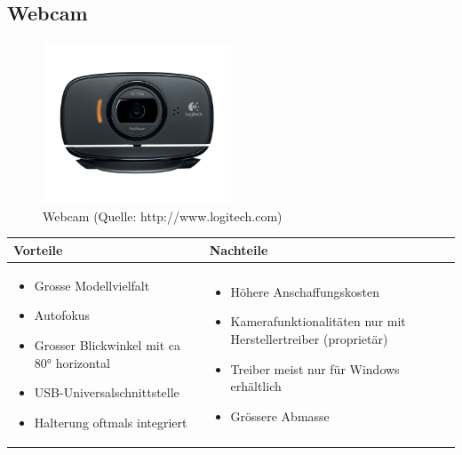 \pagebreak

\subsection{Webcam}

\begin{figure}[h!]%
\centering
\includegraphics[width=0.5\textwidth]{fig/hd-webcam-c525-gallery.png}
\caption{Webcam (Quelle: http://www.logitech.com)}
\label{fig:Webcam}
\end{figure}

\begin{table}[h]
\begin{tabular}{p{} | p{}}


 \textbf{Vorteile} & \textbf{Nachteile} \\ \hline
	 
\begin{itemize}
\item Grosse Modellvielfalt
\item Autofokus
\item Grosser Blickwinkel mit ca 80° horizontal
\item USB-Universalschnittstelle
\item Halterung oftmals integriert
\end{itemize}

 
 &
 
\begin{itemize}
\item Höhere Anschaffungskosten
\item Kamerafunktionalitäten nur mit Herstellertreiber (proprietär)
\item Treiber meist nur für Windows erhältlich
\item Grössere Abmasse
\end{itemize}

\end{tabular}
\end{table}

